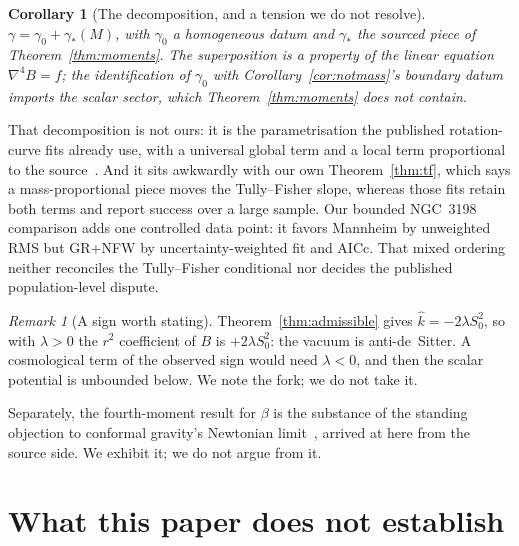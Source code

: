 \documentclass[11pt]{article}
\newtheorem{corollary}[theorem]{Corollary}
\theoremstyle{definition}
\theoremstyle{remark}
\newtheorem{remark}[theorem]{Remark}
\begin{document}
\begin{corollary}[The decomposition, and a tension we do not resolve]
\label{cor:inequality}
\(\gamma=\gamma_{0}+\gamma_{*}(M)\), with \(\gamma_{0}\) a homogeneous datum
and \(\gamma_{*}\) the sourced piece of Theorem~\ref{thm:moments}.  The
superposition is a property of the linear equation \(\nabla^{4}B=f\); the
identification of \(\gamma_{0}\) with Corollary~\ref{cor:notmass}'s boundary
datum imports the scalar sector, which Theorem~\ref{thm:moments} does not
contain.
\end{corollary}

That decomposition is not ours: it is the parametrisation the published
rotation-curve fits already use, with a universal global term and a local term
proportional to the source~\cite{MannheimOBrien2012}.  And it sits awkwardly
with our own Theorem~\ref{thm:tf}, which says a mass-proportional piece moves
the Tully--Fisher slope, whereas those fits retain both terms and report
success over a large sample.  Our bounded NGC~3198 comparison adds one
controlled data point: it favors Mannheim by unweighted RMS but GR+NFW by
uncertainty-weighted fit and AICc.  That mixed ordering neither reconciles the
Tully--Fisher conditional nor decides the published population-level dispute.

\begin{remark}[A sign worth stating]
\label{rem:sign}
Theorem~\ref{thm:admissible} gives \(\hat k=-2\lambda S_{0}^{2}\), so with
\(\lambda>0\) the \(r^{2}\) coefficient of \(B\) is \(+2\lambda S_{0}^{2}\):
the vacuum is anti-de~Sitter.  A cosmological term of the observed sign would
need \(\lambda<0\), and then the scalar potential is unbounded below.  We
note the fork; we do not take it.
\end{remark}

Separately, the fourth-moment result for \(\beta\) is the substance of the
standing objection to conformal gravity's Newtonian
limit~\cite{Flanagan2006,MK1994}, arrived at here from the source side.  We
exhibit it; we do not argue from it.

\section{What this paper does not establish}
\label{sec:notestablished}
\end{document}
